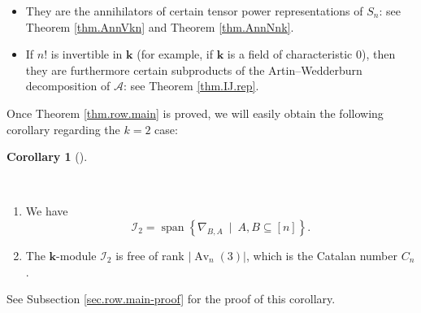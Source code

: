 \documentclass[numbers=enddot,12pt,final,onecolumn,notitlepage]{scrartcl}%
\numberwithin{exer}{subsection}
\theoremstyle{definition}
\newtheorem{coro}[theo]{Corollary}
\newenvironment{corollary}[1][]
{\begin{coro}[#1]\begin{leftbar}}
{\end{leftbar}\end{coro}}
\begin{document}
\begin{itemize}
\item They are the annihilators of certain tensor power representations of
$S_{n}$: see Theorem \ref{thm.AnnVkn} and Theorem \ref{thm.AnnNnk}.

\item If $n!$ is invertible in $\mathbf{k}$ (for example, if $\mathbf{k}$ is a
field of characteristic $0$), then they are furthermore certain subproducts of
the Artin--Wedderburn decomposition of $\mathcal{A}$: see Theorem
\ref{thm.IJ.rep}.
\end{itemize}

Once Theorem \ref{thm.row.main} is proved, we will easily obtain the following
corollary regarding the $k=2$ case:

\begin{corollary}
\label{cor.Nabla.span}\ \ 

\begin{enumerate}
\item[\textbf{(a)}] We have%
\begin{equation}
\mathcal{I}_{2}=\operatorname*{span}\left\{  \nabla_{B,A}\ \mid\ A,B\subseteq
\left[  n\right]  \right\}  . \label{eq.cor.Nabla.span.eq}%
\end{equation}


\item[\textbf{(b)}] The $\mathbf{k}$-module $\mathcal{I}_{2}$ is free of rank
$\left\vert \operatorname*{Av}\nolimits_{n}\left(  3\right)  \right\vert $,
which is the Catalan number $C_{n}$.
\end{enumerate}
\end{corollary}

See Subsection \ref{sec.row.main-proof} for the proof of this corollary.
\end{document}
